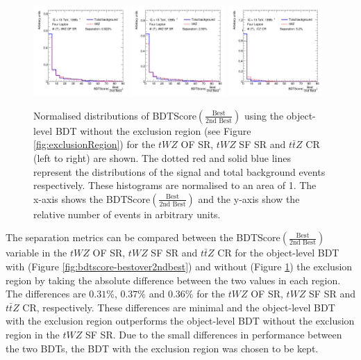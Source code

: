 \begin{figure}[h!]
    \centering
    \includegraphics[width=0.32\textwidth]{figures/bdtPlots/lep4_tWZ_4T_OF_BDT_Score_bestOver2ndBest_sep.png}
    \includegraphics[width=0.32\textwidth]{figures/bdtPlots/lep4_tWZ_4T_SF_BDT_Score_bestOver2ndBest_sep.png}
    \includegraphics[width=0.32\textwidth]{figures/bdtPlots/lep4_ttZ_4T_BDT_Score_bestOver2ndBest_sep.png}
    \caption{Normalised distributions of BDTScore$(\frac{\text{Best}}{\text{2nd Best}})$ using the object-level BDT without the exclusion region (see Figure \ref{fig:exclusionRegion}) for the $tWZ$ OF SR, $tWZ$ SF SR and $t\bar{t}Z$ CR (left to right) are shown. The dotted red and solid blue lines represent the distributions of the signal and total background events respectively. These histograms are normalised to an area of 1. The x-axis shows the BDTScore$(\frac{\text{Best}}{\text{2nd Best}})$ and the y-axis show the relative number of events in arbitrary units.}
    \label{fig:exclusionRegion-normplots}
\end{figure}The separation metrics can be compared between the BDTScore$(\frac{\text{Best}}{\text{2nd Best}})$ variable in the $tWZ$ OF SR, $tWZ$ SF SR and $t\bar{t}Z$ CR for the object-level BDT with (Figure \ref{fig:bdtscore-bestover2ndbest}) and without (Figure \ref{fig:exclusionRegion-normplots}) the exclusion region by taking the absolute difference between the two values in each region. The differences are $0.31\%$, $0.37\%$ and $0.36\%$ for the $tWZ$ OF SR, $tWZ$ SF SR and $t\bar{t}Z$ CR, respectively. These differences are minimal and the object-level BDT with the exclusion region outperforms the object-level BDT without the exclusion region in the $tWZ$ SF SR. Due to the small differences in performance between the two BDTs, the BDT with the exclusion region was chosen to be kept.

